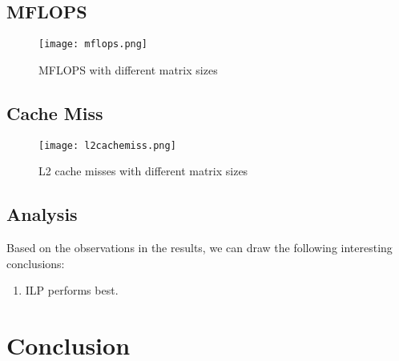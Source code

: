 \documentclass[12pt]{article}
\begin{document}
\subsection{MFLOPS}
\begin{figure}[h!]
	\begin{center}
		\texttt{[image: mflops.png]}
		\caption{\label{fig:mflops}MFLOPS with different matrix sizes}
	\end{center}
\end{figure}

\subsection{Cache Miss}
\begin{figure}[h!]
	\begin{center}
		\texttt{[image: l2cachemiss.png]}
		\caption{\label{fig:l2cachemiss}L2 cache misses with different matrix sizes}
	\end{center}
\end{figure}

\subsection{Analysis}
Based on the observations in the results, we can draw the following interesting 
conclusions:
\begin{enumerate}
\item ILP performs best.
\end{enumerate}

\section{Conclusion}
\end{document}
